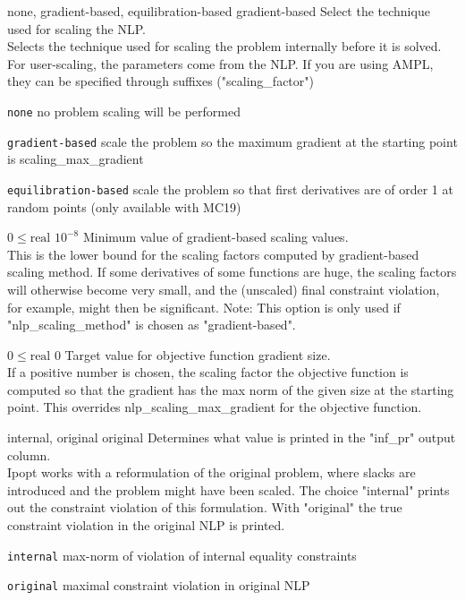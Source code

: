 %
{\ttfamily none, gradient-based, equilibration-based}%
{gradient-based}%
{Select the technique used for scaling the NLP.\\
Selects the technique used for scaling the problem internally before it is solved. For user-scaling, the parameters come from the NLP. If you are using AMPL, they can be specified through suffixes ("scaling\_factor")}%
{\begin{list}{}{
\setlength{\parsep}{0em}
\setlength{\leftmargin}{5ex}
\setlength{\labelwidth}{2ex}
\setlength{\itemindent}{0ex}
\setlength{\topsep}{0pt}}
\item[\texttt{none}] no problem scaling will be performed
\item[\texttt{gradient-based}] scale the problem so the maximum gradient at the starting point is scaling\_max\_gradient
\item[\texttt{equilibration-based}] scale the problem so that first derivatives are of order 1 at random points (only available with MC19)
\end{list}
}

%
{$0\leq\textrm{real}$}%
{$10^{- 8}$}%
{Minimum value of gradient-based scaling values.\\
This is the lower bound for the scaling factors computed by gradient-based scaling method.  If some derivatives of some functions are huge, the scaling factors will otherwise become very small, and the (unscaled) final constraint violation, for example, might then be significant.  Note: This option is only used if "nlp\_scaling\_method" is chosen as "gradient-based".}%
{}

%
{$0\leq\textrm{real}$}%
{$0$}%
{Target value for objective function gradient size.\\
If a positive number is chosen, the scaling factor the objective function is computed so that the gradient has the max norm of the given size at the starting point.  This overrides nlp\_scaling\_max\_gradient for the objective function.}%
{}

%
{\ttfamily internal, original}%
{original}%
{Determines what value is printed in the "inf\_pr" output column.\\
Ipopt works with a reformulation of the original problem, where slacks are introduced and the problem might have been scaled.  The choice "internal" prints out the constraint violation of this formulation. With "original" the true constraint violation in the original NLP is printed.}%
{\begin{list}{}{
\setlength{\parsep}{0em}
\setlength{\leftmargin}{5ex}
\setlength{\labelwidth}{2ex}
\setlength{\itemindent}{0ex}
\setlength{\topsep}{0pt}}
\item[\texttt{internal}] max-norm of violation of internal equality constraints
\item[\texttt{original}] maximal constraint violation in original NLP
\end{list}
}

